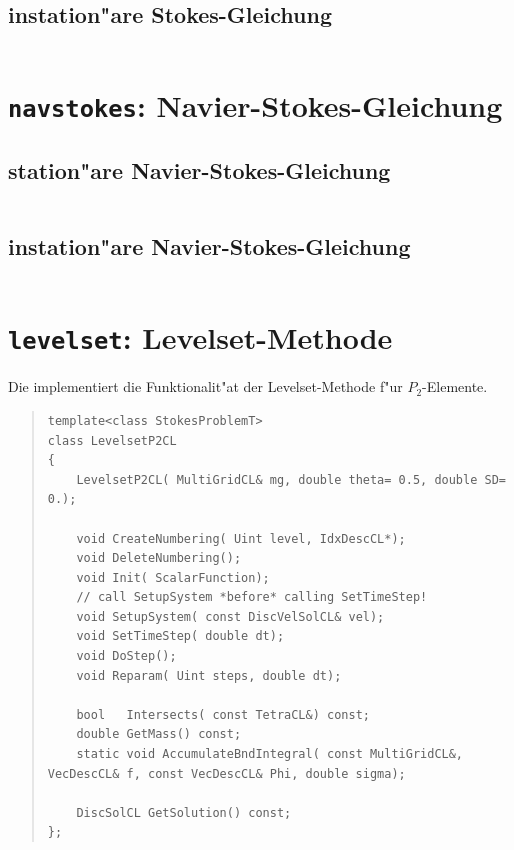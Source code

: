 \documentclass[11pt,a4paper]{article}
\newenvironment{Code}{\begin{quote}\scriptsize}{\end{quote}}
\begin{document}
\subsection{instation"are Stokes-Gleichung}
\begin{Code}
\begin{verbatim}
\end{verbatim}
\end{Code}
 
\section{{\tt navstokes}: Navier-Stokes-Gleichung}
 
\subsection{station"are Navier-Stokes-Gleichung}
\begin{Code}
\begin{verbatim}
\end{verbatim}
\end{Code}
\subsection{instation"are Navier-Stokes-Gleichung}
\begin{Code}
\begin{verbatim}
\end{verbatim}
\end{Code}
 
\section{{\tt levelset}: Levelset-Methode}

Die  implementiert die Funktionalit"at der Levelset-Methode
f"ur $P_2$-Elemente. 

\begin{Code}
\begin{verbatim}
template<class StokesProblemT>
class LevelsetP2CL
{
    LevelsetP2CL( MultiGridCL& mg, double theta= 0.5, double SD= 0.);
    
    void CreateNumbering( Uint level, IdxDescCL*);
    void DeleteNumbering();
    void Init( ScalarFunction);
    // call SetupSystem *before* calling SetTimeStep!
    void SetupSystem( const DiscVelSolCL& vel);
    void SetTimeStep( double dt);
    void DoStep();
    void Reparam( Uint steps, double dt);
    
    bool   Intersects( const TetraCL&) const;
    double GetMass() const;
    static void AccumulateBndIntegral( const MultiGridCL&, VecDescCL& f, const VecDescCL& Phi, double sigma);
    
    DiscSolCL GetSolution() const;
};
\end{verbatim}
\end{Code}
\end{document}
